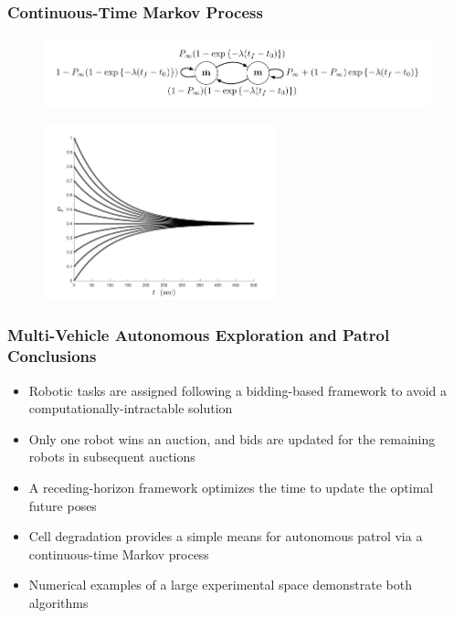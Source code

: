 \documentclass[11pt,professionalfonts,hyperref={pdftex,pdfpagemode=none,pdfstartview=FitH}]{beamer}
\begin{document}
\begin{frame}
\frametitle{Continuous-Time Markov Process}

\begin{figure}
\centering
\includegraphics[width=\textwidth]{markov_diagram_continuous.pdf}
\end{figure}

\begin{figure}
\centering
\includegraphics[width=0.6\textwidth]{DegradeExamples.pdf}
\end{figure}

\end{frame}


%
%
%
%


\begin{frame}
\frametitle{Multi-Vehicle Autonomous Exploration and Patrol Conclusions}

\begin{itemize}
	\item Robotic tasks are assigned following a bidding-based framework to avoid a computationally-intractable solution
	\item Only one robot wins an auction, and bids are updated for the remaining robots in subsequent auctions
	\item A receding-horizon framework optimizes the time to update the optimal future poses
	\item Cell degradation provides a simple means for autonomous patrol via a continuous-time Markov process
	\item Numerical examples of a large experimental space demonstrate both algorithms
\end{itemize}
\end{frame}
\end{document}
